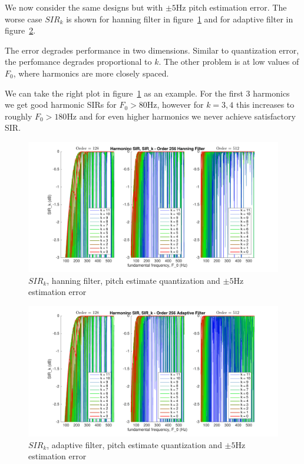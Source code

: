 \documentclass [11pt, proquest] {uwthesis}[2015/03/03]
\begin{document}
We now consider the same designs but with $\pm5$Hz pitch estimation error.  The worse case $SIR_k$ is shown for hanning filter in figure~\ref{fig:pitch_sir_k_1_error5} and for adaptive filter in figure~\ref{fig:pitch_sir_k_2_error5}.

The error degrades performance in two dimensions.  Similar to quantization error, the perfomance degrades proportional to $k$.  The other problem is at low values of $F_0$, where harmonics are more closely spaced.

We can take the right plot in figure~\ref{fig:pitch_sir_k_1_error5} as an example.  For the first 3 harmonics we get good harmonic SIRs for $F_0 > 80$Hz, however for $k = 3,4$ this increases to roughly $F_0 > 180$Hz and for even higher harmonics we never achieve satisfactory SIR.

\begin{figure}[!ht]
  \centering
    \includegraphics[width=1\textwidth]{pitch_sir_k_1_error5}
    \caption{$SIR_k$, hanning filter, pitch estimate quantization and $\pm5$Hz estimation error}\label{fig:pitch_sir_k_1_error5}
\end{figure}

\begin{figure}[!ht]
  \centering
    \includegraphics[width=1\textwidth]{pitch_sir_k_2_error5}
    \caption{$SIR_k$, adaptive filter, pitch estimate quantization and $\pm5$Hz estimation error}\label{fig:pitch_sir_k_2_error5}
\end{figure}
\end{document}
